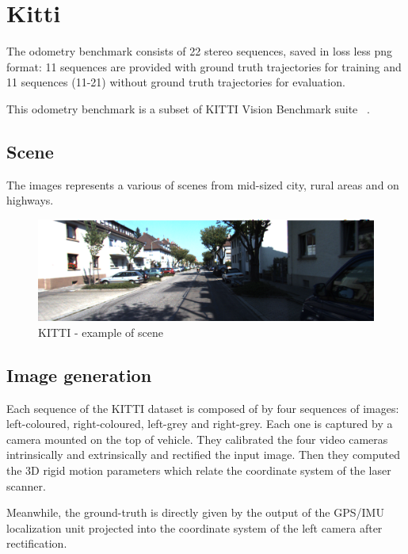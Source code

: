 
\section{Kitti}
\label{sec:kitti}

The odometry benchmark consists of 22 stereo sequences, saved in loss less png format: 11 sequences are provided with ground truth trajectories for training and 11 sequences (11-21) without ground truth trajectories for evaluation.

This odometry benchmark is a subset of KITTI Vision Benchmark suite ~\cite{kitti_dataset}.

\subsection{Scene}\label{subsec:kitti-scene}
The images represents a various of scenes from mid-sized city, rural areas and on highways.
\begin{figure}[H]
    \centering
    \includegraphics[width=\textwidth]{images/3_1_example_kitti_scene}
    \caption{KITTI - example of scene}\label{fig:example-of-kitti-scene}
\end{figure}

\subsection{Image generation}\label{subsec:kitti-image-generation}
Each sequence of the KITTI dataset is composed of by four sequences of images: left-coloured, right-coloured, left-grey and right-grey.
Each one is captured by a camera mounted on the top of vehicle.
They calibrated the four video cameras intrinsically and extrinsically and rectified the input image.
Then they computed the 3D rigid motion parameters which relate the coordinate system of the laser scanner.

Meanwhile, the ground-truth is directly given by the output of the GPS/IMU localization unit projected into the coordinate system of the left camera after rectification.


